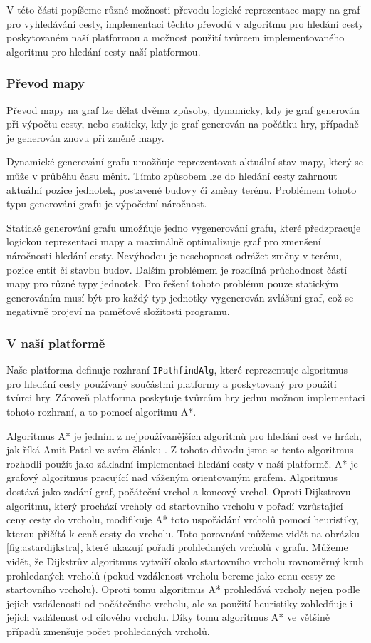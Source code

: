 V této části popíšeme různé možnosti převodu logické reprezentace mapy na graf pro vyhledávání cesty, implementaci těchto převodů v algoritmu pro hledání cesty poskytovaném naší platformou a možnost použití tvůrcem implementovaného algoritmu pro hledání cesty naší platformou.


\subsubsection{Převod mapy}
Převod mapy na graf lze dělat dvěma způsoby, dynamicky, kdy je graf generován při výpočtu cesty, nebo staticky, kdy je graf generován na počátku hry, případně je generován znovu při změně mapy.

Dynamické generování grafu umožňuje reprezentovat aktuální stav mapy, který se může v průběhu času měnit. Tímto způsobem lze do hledání cesty zahrnout aktuální pozice jednotek, postavené budovy či změny terénu. Problémem tohoto typu generování grafu je výpočetní náročnost.

Statické generování grafu umožňuje jedno vygenerování grafu, které předzpracuje logickou reprezentaci mapy a maximálně optimalizuje graf pro zmenšení náročnosti hledání cesty. Nevýhodou je neschopnost odrážet změny v terénu, pozice entit či stavbu budov. Dalším problémem je rozdílná průchodnost částí mapy pro různé typy jednotek. Pro řešení tohoto problému pouze statickým generováním musí být pro každý typ jednotky vygenerován zvláštní graf, což se negativně projeví na paměťové složitosti programu.

\subsubsection{V naší platformě}
\label{sec:astar}
Naše platforma definuje rozhraní \texttt{IPathfindAlg}, které reprezentuje algoritmus pro hledání cesty používaný součástmi platformy a poskytovaný pro použití tvůrci hry. Zároveň platforma poskytuje tvůrcům hry jednu možnou implementaci tohoto rozhraní, a to pomocí algoritmu A*.

Algoritmus A* je jedním z nejpoužívanějších algoritmů pro hledání cest ve hrách, jak říká Amit Patel ve svém článku \citep{site:introastar}. Z tohoto důvodu jsme se tento algoritmus rozhodli použít jako základní implementaci hledání cesty v naší platformě. A* je grafový algoritmus pracující nad váženým orientovaným grafem. Algoritmus dostává jako zadání graf, počáteční vrchol a koncový vrchol. Oproti Dijkstrovu algoritmu, který prochází vrcholy od startovního vrcholu v pořadí vzrůstající ceny cesty do vrcholu, modifikuje A* toto uspořádání vrcholů pomocí heuristiky, kterou přičítá k ceně cesty do vrcholu. Toto porovnání můžeme vidět na obrázku \ref{fig:astardijkstra}, které ukazují pořadí prohledaných vrcholů v grafu. Můžeme vidět, že Dijkstrův algoritmus vytváří okolo startovního vrcholu rovnoměrný kruh prohledaných vrcholů (pokud vzdálenost vrcholu bereme jako cenu cesty ze startovního vrcholu). Oproti tomu algoritmus A* prohledává vrcholy nejen podle jejich vzdálenosti od počátečního vrcholu, ale za použití heuristiky zohledňuje i jejich vzdálenost od cílového vrcholu. Díky tomu algoritmus A* ve většině případů zmenšuje počet prohledaných vrcholů.

